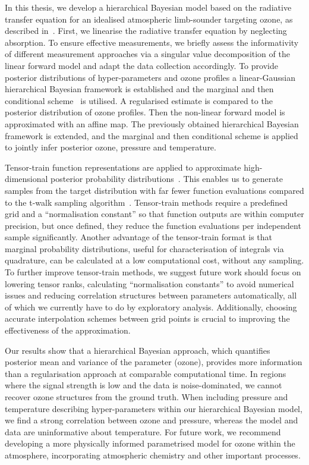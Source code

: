 \vspace{-1ex}
In this thesis, we develop a hierarchical Bayesian model based on the radiative transfer equation for an idealised atmospheric limb-sounder targeting ozone, as described in~\cite{mipas2000handbook}.
First, we linearise the radiative transfer equation by neglecting absorption.
To ensure effective measurements, we briefly assess the informativity of different measurement approaches via a singular value decomposition of the linear forward model and adapt the data collection accordingly.
To provide posterior distributions of hyper-parameters and ozone profiles a linear-Gaussian hierarchical Bayesian framework is established and the marginal and then conditional scheme~\cite{fox2016fast} is utilised.
A regularised estimate is compared to the posterior distribution of ozone profiles.
Then the non-linear forward model is approximated with an affine map.
The previously obtained hierarchical Bayesian framework is extended, and the marginal and then conditional scheme is applied to jointly infer posterior ozone, pressure and temperature.

Tensor-train function representations are applied to approximate high-dimensional posterior probability distributions~\cite{cui2022deep, dolgov2020approximation}.
This enables us to generate samples from the target distribution with far fewer function evaluations compared to the t-walk sampling algorithm~\cite{christen2010general}.
Tensor-train methods require a predefined grid and a ``normalisation constant'' so that function outputs are within computer precision, but once defined, they reduce the function evaluations per independent sample significantly.
Another advantage of the tensor-train format is that marginal probability distributions, useful for characterisation of integrals via quadrature, can be calculated at a low computational cost, without any sampling.
To further improve tensor-train methods, we suggest future work should focus on lowering tensor ranks, calculating ``normalisation constants'' to avoid numerical issues and reducing correlation structures between parameters automatically, all of which we currently have to do by exploratory analysis.
Additionally, choosing accurate interpolation schemes between grid points is crucial to improving the effectiveness of the approximation.

Our results show that a hierarchical Bayesian approach, which quantifies posterior mean and variance of the parameter (ozone), provides more information than a regularisation approach at comparable computational time.
In regions where the signal strength is low and the data is noise-dominated, we cannot recover ozone structures from the ground truth.
When including pressure and temperature describing hyper-parameters within our hierarchical Bayesian model, we find a strong correlation between ozone and pressure, whereas the model and data are uninformative about temperature.
For future work, we recommend developing a more physically informed parametrised model for ozone within the atmosphere, incorporating atmospheric chemistry and other important processes.